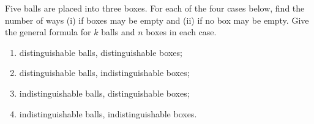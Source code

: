Five balls are placed into three boxes. For each of the four cases below, find the number of ways (i) if boxes may be empty and (ii) if no box may be empty. Give the general formula for $k$ balls and $n$ boxes in each case.
\begin{enumerate}
\item distinguishable balls, distinguishable boxes;
\item distinguishable balls, indistinguishable boxes;
\item indistinguishable balls, distinguishable boxes;
\item indistinguishable balls, indistinguishable boxes.
\end{enumerate}

